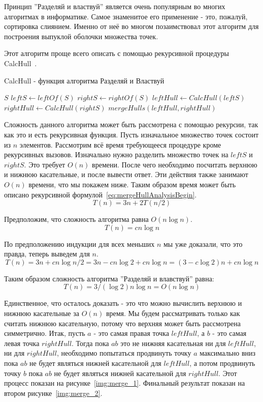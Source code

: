 Принцип ''Разделяй и властвуй'' является очень популярным во многих алгоритмах в информатике. Самое знаменитое его применение - это, пожалуй, сортировка слиянием. Именно от неё во многом позаимствовал этот алгоритм для построения выпуклой оболочки множества точек.

Этот алгоритм проще всего описать с помощью рекурсивной процедуры CalcHull~\cite{mount2000lecture}.

\begin{algorithm}[H]
	\caption{CalcHull - функция алгоритма Разделяй и Властвуй}
	\begin{algorithmic}[1]
			\Return $S$
		\EndIf
		\State $leftS\gets leftOf(S)$ 
		\State $rightS\gets rightOf(S)$ 
		\State $leftHull\gets CalcHull(leftS)$
		\State $rightHull\gets CalcHull(rightS)$
		\State
		\Return $mergeHulls(leftHull, rightHull)$
		\EndProcedure
	\end{algorithmic}
\end{algorithm}

Сложность данного алгоритма может быть рассмотрена с помощью рекурсии, так как это и есть рекурсивная функция. Пусть изначальное множество точек состоит из $n$ элементов. Рассмотрим всё время требующееся процедуре кроме рекурсивных вызовов. Изначально нужно разделить множество точек на $leftS$ и $rightS$. Это требует $O(n)$ времени. После чего необходимо посчитать верхнюю и нижнюю касательные, и после вывести ответ. Эти действия также занимают $O(n)$ времени, что мы покажем ниже. Таким образом время может быть описано рекурсивной формулой~\ref{eq:mergeHullAnalysisBegin}.
\begin{equation}\label{eq:mergeHullAnalysisBegin}
T(n) = 3n + 2T(n/2)
\end{equation}

Предположим, что сложность алгоритма равна $O(n \log n)$.
\[
T(n) = cn \log n
\]

По предположению индукции для всех меньших $n$ мы уже доказали, что это правда, теперь выведем для $n$.
\[
T(n) = 3n + cn \log n/2 = 3n - cn \log 2 + cn \log n = (3 - c \log 2)n + cn \log n
\]

Таким образом сложность алгоритма ''Разделяй и влавствуй'' равна:
\[
T(n) = 3/(\log 2)n \log n = O(n \log n)
\]

Единственное, что осталось доказать - это что можно вычислить верхнюю и нижнюю касательные за $O(n)$ время. Мы будем рассматривать только как считать нижнюю касательную, потому что верхняя может быть рассмотрена симметрично. Итак, пусть $a$ - это самая правая точка $leftHull$, а $b$ - это самая левая точка $rightHull$. Тогда пока $ab$ это не нижняя касательная ни для $leftHull$, ни для $rightHull$, необходимо попытаться продвинуть точку $a$ максимально вниз пока $ab$ не будет являться нижней касательной для $leftHull$, а потом продвинуть точку $b$ пока $ab$ не будет являться нижней касательной для $rightHull$. Этот процесс показан на рисунке~\ref{img:merge_1}. Финальный результат показан на втором рисунке~\ref{img:merge_2}.

